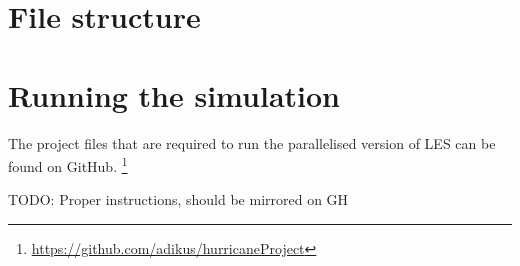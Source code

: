 \documentclass{l4proj}
\begin{document}
\begin{appendices}

\chapter{File structure}

\chapter{Running the simulation}
\label{chap:running}

The project files that are required to run the parallelised version of LES can be found on GitHub.
\footnote{\url{https://github.com/adikus/hurricaneProject}}

TODO: Proper instructions, should be mirrored on GH

\end{appendices}



  

\end{document}
